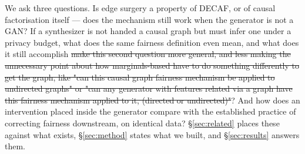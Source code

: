 {We ask three questions. Is edge surgery a property of DECAF, or of causal
factorisation itself --- does the mechanism still work when the generator is not a
GAN? If a synthesizer is not handed a causal graph but must infer one under a
privacy budget, what does the same fairness definition even mean, and what does it
still accomplish \st{make this second question more general, and less making the unnecessary point about how marginals-based have to do something differently to get the graph, like "can this causal graph fairness mechanism be applied to undirected graphs" or "can any generator with features related via a graph have this fairness mechanism applied to it, (directed or undirected)"}? And how does an intervention placed inside the generator compare
with the established practice of correcting fairness downstream, on identical data?
\S\ref{sec:related} places these against what exists, \S\ref{sec:method} states
what we built, and \S\ref{sec:results} answers them.%
}

